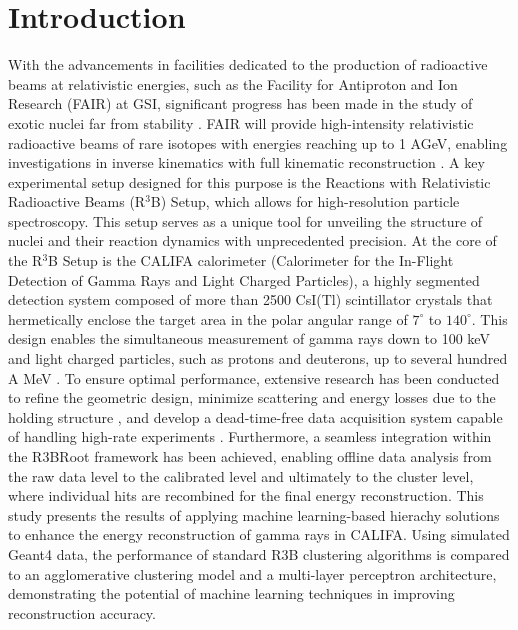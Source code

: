 \documentclass[final,5p,times,twocolumn]{elsarticle}
\begin{document}
\section{Introduction}
\label{sec:intro}
With the advancements in facilities dedicated to the production of radioactive beams at relativistic energies, such as the Facility for Antiproton and Ion Research (FAIR) at GSI, significant progress has been made in the study of exotic nuclei far from stability \cite{kalantar2024experiments}. FAIR will provide high-intensity relativistic radioactive beams of rare isotopes with energies reaching up to 1 AGeV, enabling investigations in inverse kinematics with full kinematic reconstruction \cite{leifels2025status}.
A key experimental setup designed for this purpose is the Reactions with Relativistic Radioactive Beams (R$^3$B) Setup, which allows for high-resolution particle spectroscopy. This setup serves as a unique tool for unveiling the structure of nuclei and their reaction dynamics with unprecedented precision.\newline
At the core of the R$^3$B Setup is the CALIFA calorimeter (Calorimeter for the In-Flight Detection of Gamma Rays and Light Charged Particles), a highly segmented detection system composed of more than 2500 CsI(Tl) scintillator crystals that hermetically enclose the target area in the polar angular range of $7^\circ$ to $140^\circ$. This design enables the simultaneous measurement of gamma rays down to 100 keV and light charged particles, such as protons and deuterons, up to several hundred A MeV \cite{cortina2014califa}. To ensure optimal performance, extensive research has been conducted to refine the geometric design, minimize scattering and energy losses due to the holding structure \cite{alvarez2014performance}, and develop a dead-time-free data acquisition system capable of handling high-rate experiments \cite{ledigital}. Furthermore, a seamless integration within the R3BRoot framework \cite{bertini2011r3broot} has been achieved, enabling offline data analysis from the raw data level to the calibrated level and ultimately to the cluster level, where individual hits are recombined for the final energy reconstruction.\newline
This study presents the results of applying machine learning-based hierachy solutions to enhance the energy reconstruction of gamma rays in CALIFA. Using simulated Geant4 data, the performance of standard R3B clustering algorithms is compared to an agglomerative clustering model \cite{Nielsen2016} and a multi-layer perceptron architecture, demonstrating the potential of machine learning techniques in improving reconstruction accuracy.\newline
\end{document}
